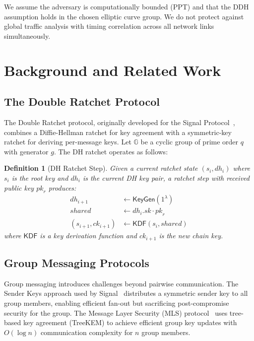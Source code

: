 \documentclass[11pt,a4paper]{article}
\newcommand{\secparam}{\lambda}
\newcommand{\GG}{\mathbb{G}}
\newtheorem{definition}{Definition}
\begin{document}
We assume the adversary is computationally bounded (PPT) and that the DDH assumption holds in the chosen elliptic curve group. We do not protect against global traffic analysis with timing correlation across all network links simultaneously.

\section{Background and Related Work}

\subsection{The Double Ratchet Protocol}

The Double Ratchet protocol, originally developed for the Signal Protocol~\citep{marlinspike2016signal}, combines a Diffie-Hellman ratchet for key agreement with a symmetric-key ratchet for deriving per-message keys. Let $\GG$ be a cyclic group of prime order $q$ with generator $g$. The DH ratchet operates as follows:

\begin{definition}[DH Ratchet Step]
Given a current ratchet state $(s_i, \mathit{dh}_i)$ where $s_i$ is the root key and $\mathit{dh}_i$ is the current DH key pair, a ratchet step with received public key $\mathit{pk}_r$ produces:
\begin{align}
    \mathit{dh}_{i+1} &\leftarrow \mathsf{KeyGen}(1^\secparam) \\
    \mathit{shared} &\leftarrow \mathit{dh}_i.\mathit{sk} \cdot \mathit{pk}_r \\
    (s_{i+1}, \mathit{ck}_{i+1}) &\leftarrow \mathsf{KDF}(s_i, \mathit{shared})
\end{align}
where $\mathsf{KDF}$ is a key derivation function and $\mathit{ck}_{i+1}$ is the new chain key.
\end{definition}

\subsection{Group Messaging Protocols}

Group messaging introduces challenges beyond pairwise communication. The Sender Keys approach used by Signal~\citep{chase2020signal} distributes a symmetric sender key to all group members, enabling efficient fan-out but sacrificing post-compromise security for the group. The Message Layer Security (MLS) protocol~\citep{barnes2023mls} uses tree-based key agreement (TreeKEM) to achieve efficient group key updates with $O(\log n)$ communication complexity for $n$ group members.
\end{document}
